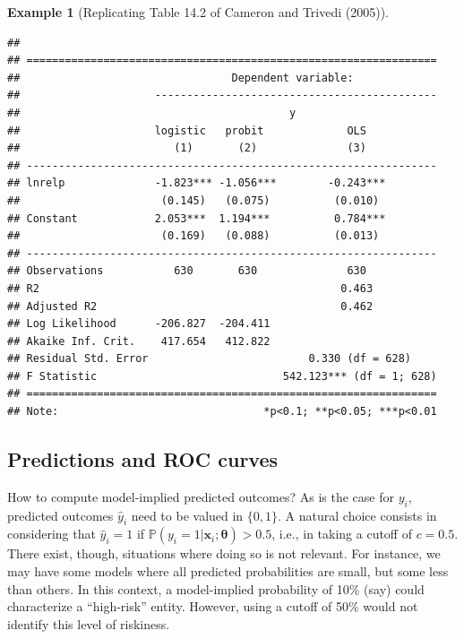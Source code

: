 \documentclass[
  12pt,
]{book}
\theoremstyle{definition}
\theoremstyle{definition}
\newtheorem{example}{Example}[chapter]
\theoremstyle{definition}
\theoremstyle{definition}
\theoremstyle{remark}
\begin{document}
\begin{example}[Replicating Table 14.2 of Cameron and Trivedi (2005)]
\begin{verbatim}
## 
## ================================================================
##                                 Dependent variable:             
##                     --------------------------------------------
##                                          y                      
##                     logistic   probit             OLS           
##                        (1)       (2)              (3)           
## ----------------------------------------------------------------
## lnrelp              -1.823*** -1.056***        -0.243***        
##                      (0.145)   (0.075)          (0.010)         
## Constant            2.053***  1.194***          0.784***        
##                      (0.169)   (0.088)          (0.013)         
## ----------------------------------------------------------------
## Observations           630       630              630           
## R2                                               0.463          
## Adjusted R2                                      0.462          
## Log Likelihood      -206.827  -204.411                          
## Akaike Inf. Crit.    417.654   412.822                          
## Residual Std. Error                         0.330 (df = 628)    
## F Statistic                             542.123*** (df = 1; 628)
## ================================================================
## Note:                                *p<0.1; **p<0.05; ***p<0.01
\end{verbatim}

\end{example}

\hypertarget{predictions-and-roc-curves}{%
\subsection{Predictions and ROC curves}\label{predictions-and-roc-curves}}

How to compute model-implied predicted outcomes? As is the case for \(y_i\), predicted outcomes \(\hat{y}_i\) need to be valued in \(\{0,1\}\). A natural choice consists in considering that \(\hat{y}_i=1\) if \(\mathbb{P}(y_i=1|\mathbf{x}_i;\boldsymbol\theta) > 0.5\), i.e., in taking a cutoff of \(c=0.5\). There exist, though, situations where doing so is not relevant. For instance, we may have some models where all predicted probabilities are small, but some less than others. In this context, a model-implied probability of 10\% (say) could characterize a ``high-risk'' entity. However, using a cutoff of 50\% would not identify this level of riskiness.
\end{document}
